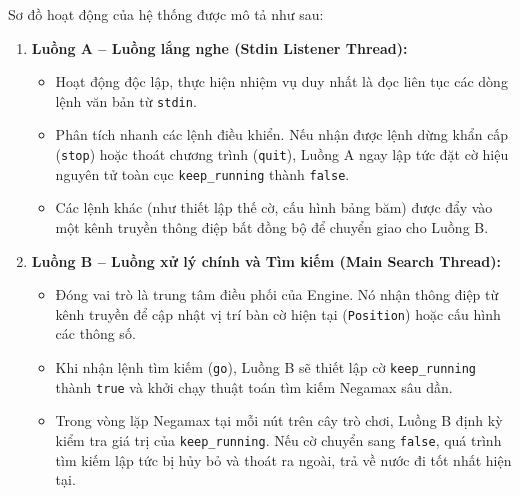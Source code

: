 Sơ đồ hoạt động của hệ thống được mô tả như sau:
\begin{enumerate}
    \item \textbf{Luồng A -- Luồng lắng nghe (Stdin Listener Thread):}
    \begin{itemize}
        \item Hoạt động độc lập, thực hiện nhiệm vụ duy nhất là đọc liên tục các dòng lệnh văn bản từ \texttt{stdin}.
        \item Phân tích nhanh các lệnh điều khiển. Nếu nhận được lệnh dừng khẩn cấp (\texttt{stop}) hoặc thoát chương trình (\texttt{quit}), Luồng A ngay lập tức đặt cờ hiệu nguyên tử toàn cục \texttt{keep\_running} thành \texttt{false}.
        \item Các lệnh khác (như thiết lập thế cờ, cấu hình bảng băm) được đẩy vào một kênh truyền thông điệp bất đồng bộ để chuyển giao cho Luồng B.
    \end{itemize}
    \item \textbf{Luồng B -- Luồng xử lý chính và Tìm kiếm (Main Search Thread):}
    \begin{itemize}
        \item Đóng vai trò là trung tâm điều phối của Engine. Nó nhận thông điệp từ kênh truyền để cập nhật vị trí bàn cờ hiện tại (\texttt{Position}) hoặc cấu hình các thông số.
        \item Khi nhận lệnh tìm kiếm (\texttt{go}), Luồng B sẽ thiết lập cờ \texttt{keep\_running} thành \texttt{true} và khởi chạy thuật toán tìm kiếm Negamax sâu dần.
        \item Trong vòng lặp Negamax tại mỗi nút trên cây trò chơi, Luồng B định kỳ kiểm tra giá trị của \texttt{keep\_running}. Nếu cờ chuyển sang \texttt{false}, quá trình tìm kiếm lập tức bị hủy bỏ và thoát ra ngoài, trả về nước đi tốt nhất hiện tại.
    \end{itemize}
\end{enumerate}

